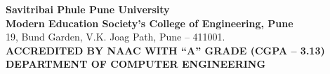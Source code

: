 \documentclass[a4paper, 12pt]{report}
\begin{document}
\newenvironment{frontmatter}{}{}
\begin{frontmatter}
\begin{titlepage}
    \begin{center}
        \textup{\large  \textbf{Savitribai Phule Pune University}\\\textbf{Modern Education Society’s College of Engineering, Pune}}\\19, Bund Garden, V.K. Joag Path, Pune – 411001.\\[0.5cm]\textbf{ACCREDITED BY NAAC WITH “A” GRADE (CGPA – 3.13)}\\[0.5cm]\textbf{\large DEPARTMENT OF COMPUTER ENGINEERING}


        \begin{center}
            \begin{figure}[h]  %
                \centering
            \end{figure}
        \end{center}


\end{center}
\end{titlepage}
\end{frontmatter}
\end{document}
